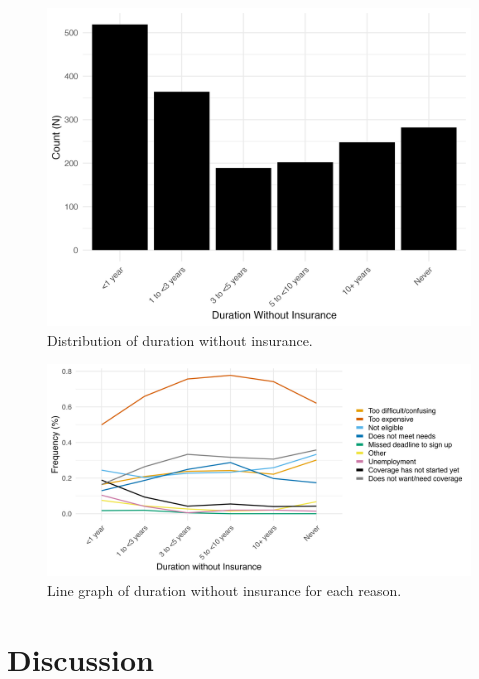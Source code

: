 \documentclass[12pt]{article}
\begin{document}
\begin{figure}[H]
  \centering
  \includegraphics[width=15cm]{figures/duration_no_insurance.png}
  \caption{Distribution of duration without insurance.}
\end{figure}

\begin{figure}[H]
  \centering
  \includegraphics[width=18cm]{figures/duration_no_insurance_by_reason.png}
  \caption{Line graph of duration without insurance for each reason.}
\end{figure}


\newpage
\section{Discussion}


\newpage

\printbibliography
\end{document}
